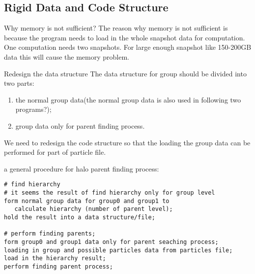 \documentclass[notheorems, aspectratio=54]{beamer}
\begin{document}
\subsection{Rigid Data and Code Structure}
\begin{frame}

\begin{block}{Why memory is not sufficient?} 
The reason why memory is not sufficient is because the program needs to load in the whole snapshot data for computation. 
One computation needs two snapshots. For large enough snapshot like 150-200GB data this will cause the memory problem.
 \end{block}

\begin{block}{Redesign the data structure}
The data structure for group should be divided into two parts:
 \begin{enumerate}
  \item the normal group data(the normal group data is also used in following two programs?);
  \item group data only for parent finding process.
 \end{enumerate}
 We need to redesign the code structure so that the loading the group data can be performed for part of particle file. 
\end{block}

\end{frame}

\begin{frame}[fragile]

a general procedure for halo parent finding process:
\begin{verbatim}
# find hierarchy
# it seems the result of find hierarchy only for group level
form normal group data for group0 and group1 to 
   calculate hierarchy (number of parent level);
hold the result into a data structure/file;

# perform finding parents;
form group0 and group1 data only for parent seaching process;
loading in group and possible particles data from particles file;
load in the hierarchy result;
perform finding parent process;
\end{verbatim}

\end{frame}
\end{document}
